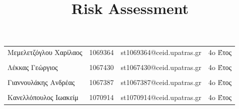 \documentclass{../ol-softwaremanual}
\begin{document}
	
	
	\begin{titlepage}
		
		
		\title{\en Risk Assessment \\}
	\end{titlepage}
	
	
	\maketitle
	
	\newpage
	
	
	\vspace{20pt}
	
	
	
	\begin{table}[htbp!]
		
		\begin{tabular}{llll}
			Μεμελετζόγλου Χαρίλαος & 1069364 & \en st1069364@ceid.upatras.gr & 4o Έτος   \\ 
			\\ Λέκκας Γεώργιος      &      1067430    &   \en st1067430@ceid.upatras.gr & 4o Έτος  \\
			\\ Γιαννουλάκης Ανδρέας        &   1067387       & \en st1067387@ceid.upatras.gr & 4o Έτος           \\
			\\ Κανελλόπουλος Ιωακείμ        &  1070914        &    \en st1070914@ceid.upatras.gr & 4o Έτος        \\ 
		\end{tabular}
	\end{table}
	
\end{document}

